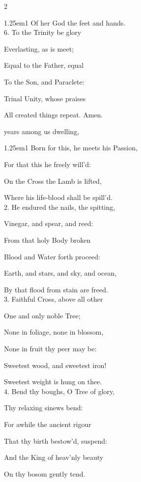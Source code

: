 \begin{paracol}{2}
\begin{hangparas}{1.25em}{1}
Of her God the feet and hands.\\

6. To the Trinity be glory

Everlasting, as is meet;

Equal to the Father, equal

To the Son, and Paraclete:

Trinal Unity, whose praises

All created things repeat. Amen.
\end{hangparas}

\mattinsOfficeHymn
{} years among us dwelling,


\begin{hangparas}{1.25em}{1}
Born for this, he meets his Passion,

For that this he freely will'd:

On the Cross the Lamb is lifted,

Where his life-blood shall be spill'd.\\

2. He endured the nails, the spitting,

Vinegar, and spear, and reed:

From that holy Body broken

Blood and Water forth proceed:

Earth, and stars, and sky, and ocean,

By that flood from stain are freed.\\

3. Faithful Cross, above all other

One and only noble Tree;

None in foliage, none in blossom,

None in fruit thy peer may be:

Sweetest wood, and sweetest iron!

Sweetest weight is hung on thee.\\

4. Bend thy boughs, O Tree of glory,

Thy relaxing sinews bend:

For awhile the ancient rigour

That thy birth bestow'd, suspend:

And the King of heav'nly beauty

On thy bosom gently tend.\\


\end{hangparas}
\end{paracol}
